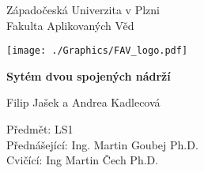 \documentclass[12pt]{article}
\begin{document}
\begin{titlepage}
\begin{center}
        \huge
        Západočeská Univerzita v Plzni\\
        Fakulta Aplikovaných Věd\\
        
        \vspace{1cm}
        
        \texttt{[image: ./Graphics/FAV\_logo.pdf]}
        
        \vspace{4cm}
        \huge
        \textbf{Sytém dvou spojených nádrží}
        
        \vspace{0.5cm}
        \LARGE
        Filip Jašek a Andrea Kadlecová
        
    \end{center} 
    \vfill
        \noindent
        \large
        Předmět: LS1\\
        Přednášející: Ing. Martin Goubej Ph.D.\\
        Cvičící: Ing Martin Čech Ph.D.
\end{titlepage}
\end{document}
